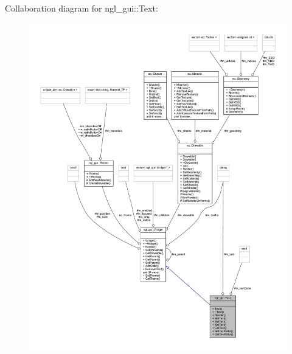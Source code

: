 Collaboration diagram for ngl\+\_\+gui\+:\+:Text\+:
\nopagebreak
\begin{figure}[H]
\begin{center}
\leavevmode
\includegraphics[width=350pt]{classngl__gui_1_1_text__coll__graph}
\end{center}
\end{figure}

